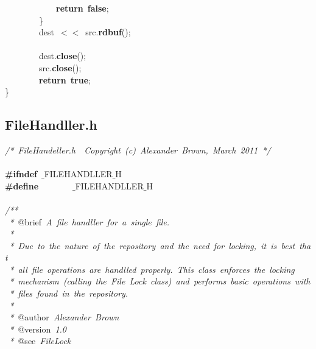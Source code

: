 \mbox{}\ \ \ \ \ \ \ \ \ \ \ \ \textbf{return}\ \textbf{false}; \\
\mbox{}\ \ \ \ \ \ \ \ \} \\
\mbox{}\ \ \ \ \ \ \ \ dest\ $<$$<$\ src.\textbf{rdbuf}(); \\
\mbox{} \\
\mbox{}\ \ \ \ \ \ \ \ dest.\textbf{close}(); \\
\mbox{}\ \ \ \ \ \ \ \ src.\textbf{close}(); \\
\mbox{}\ \ \ \ \ \ \ \ \textbf{return}\ \textbf{true}; \\
\mbox{}\} \\

\clearpage
\normalsize
\rmfamily
\subsection{FileHandller.h}
\scriptsize
\sffamily
\noindent
\mbox{}\textit{/*\ FileHandeller.h\ \ Copyright\ (c)\ Alexander\ Brown,\ March\ 2011\ */} \\
\mbox{} \\
\mbox{}\textbf{\#ifndef}\ $\_$FILEHANDLLER$\_$H \\
\mbox{}\textbf{\#define}\ \ \ \ \ \ \ \ $\_$FILEHANDLLER$\_$H \\
\mbox{} \\
\mbox{}\textit{/**} \\
\mbox{}\textit{\ *\ }@brief\textit{\ A\ file\ handller\ for\ a\ single\ file.} \\
\mbox{}\textit{\ *} \\
\mbox{}\textit{\ *\ Due\ to\ the\ nature\ of\ the\ repository\ and\ the\ need\ for\ locking,\ it\ is\ best\ that} \\
\mbox{}\textit{\ *\ all\ file\ operations\ are\ handlled\ properly.\ This\ class\ enforces\ the\ locking} \\
\mbox{}\textit{\ *\ mechanism\ (calling\ the\ File\ Lock\ class)\ and\ performs\ basic\ operations\ with} \\
\mbox{}\textit{\ *\ files\ found\ in\ the\ repository.} \\
\mbox{}\textit{\ *} \\
\mbox{}\textit{\ *\ }@author\textit{\ Alexander\ Brown} \\
\mbox{}\textit{\ *\ }@version\textit{\ 1.0} \\
\mbox{}\textit{\ *\ }@see\textit{\ FileLock} \\
